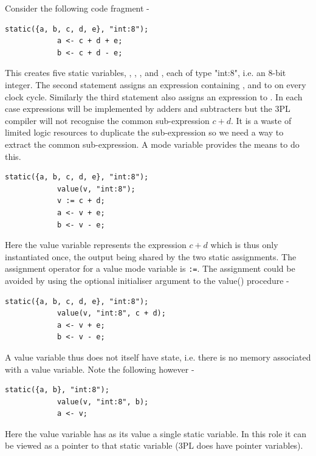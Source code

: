       Consider the following code fragment -
        \begin{lstlisting}[language=threepl]
            static({a, b, c, d, e}, "int:8");
            a <- c + d + e;
            b <- c + d - e;
        \end{lstlisting}
        This creates five static variables, , , , 
        and , each of
        type "int:8", i.e. an 8-bit integer.
        The second statement assigns an expression containing , 
        and  to  on every clock cycle. Similarly the third statement
        also assigns an expression to . In each case expressions will be
        implemented by adders and subtracters but the 3PL compiler will not recognise
        the common sub-expression $c + d$. It is a waste of limited logic resources
        to duplicate the sub-expression so we need a way to extract the common
        sub-expression. A  mode variable provides the means to do this.
        \begin{lstlisting}[language=threepl]
            static({a, b, c, d, e}, "int:8");
            value(v, "int:8");
            v := c + d;
            a <- v + e;
            b <- v - e;
        \end{lstlisting}
        Here the value variable represents the expression $c + d$ which is thus
        only instantiated once, the output being shared by the two static assignments.
        The assignment operator for a value mode variable is \verb':='.
        The assignment could be avoided by using the optional initialiser argument
        to the value() procedure -
        \begin{lstlisting}[language=threepl]
            static({a, b, c, d, e}, "int:8");
            value(v, "int:8", c + d);
            a <- v + e;
            b <- v - e;
        \end{lstlisting}

        A value variable thus does not itself have state, i.e. there is no memory
        associated with a value variable. Note the following however -
        \begin{lstlisting}[language=threepl]
            static({a, b}, "int:8");
            value(v, "int:8", b);
            a <- v;
        \end{lstlisting}
        Here the value variable has as its value a single static variable. In this
        role it can be viewed as a pointer to that static variable (3PL does have
        pointer variables).

